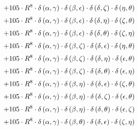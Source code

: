 \begin{subequations}
\begin{gather}
 \\[0.2em] \notag 		 + 105 \cdot R^{8} \cdot \delta{}\left(\alpha{}, \gamma{}\right) \cdot \delta{}\left(\beta{}, \epsilon{}\right) \cdot \delta{}\left(\delta{}, \zeta{}\right) \cdot \delta{}\left(\eta{}, \theta{}\right) 
 \\[0.2em] \notag 		 + 105 \cdot R^{8} \cdot \delta{}\left(\alpha{}, \gamma{}\right) \cdot \delta{}\left(\beta{}, \epsilon{}\right) \cdot \delta{}\left(\delta{}, \eta{}\right) \cdot \delta{}\left(\zeta{}, \theta{}\right) 
 \\[0.2em] \notag 		 + 105 \cdot R^{8} \cdot \delta{}\left(\alpha{}, \gamma{}\right) \cdot \delta{}\left(\beta{}, \epsilon{}\right) \cdot \delta{}\left(\delta{}, \theta{}\right) \cdot \delta{}\left(\zeta{}, \eta{}\right) 
 \\[0.2em] \notag 		 + 105 \cdot R^{8} \cdot \delta{}\left(\alpha{}, \gamma{}\right) \cdot \delta{}\left(\beta{}, \zeta{}\right) \cdot \delta{}\left(\delta{}, \epsilon{}\right) \cdot \delta{}\left(\eta{}, \theta{}\right) 
 \\[0.2em] \notag 		 + 105 \cdot R^{8} \cdot \delta{}\left(\alpha{}, \gamma{}\right) \cdot \delta{}\left(\beta{}, \zeta{}\right) \cdot \delta{}\left(\delta{}, \eta{}\right) \cdot \delta{}\left(\epsilon{}, \theta{}\right) 
 \\[0.2em] \notag 		 + 105 \cdot R^{8} \cdot \delta{}\left(\alpha{}, \gamma{}\right) \cdot \delta{}\left(\beta{}, \zeta{}\right) \cdot \delta{}\left(\delta{}, \theta{}\right) \cdot \delta{}\left(\epsilon{}, \eta{}\right) 
 \\[0.2em] \notag 		 + 105 \cdot R^{8} \cdot \delta{}\left(\alpha{}, \gamma{}\right) \cdot \delta{}\left(\beta{}, \eta{}\right) \cdot \delta{}\left(\delta{}, \epsilon{}\right) \cdot \delta{}\left(\zeta{}, \theta{}\right) 
 \\[0.2em] \notag 		 + 105 \cdot R^{8} \cdot \delta{}\left(\alpha{}, \gamma{}\right) \cdot \delta{}\left(\beta{}, \eta{}\right) \cdot \delta{}\left(\delta{}, \zeta{}\right) \cdot \delta{}\left(\epsilon{}, \theta{}\right) 
 \\[0.2em] \notag 		 + 105 \cdot R^{8} \cdot \delta{}\left(\alpha{}, \gamma{}\right) \cdot \delta{}\left(\beta{}, \eta{}\right) \cdot \delta{}\left(\delta{}, \theta{}\right) \cdot \delta{}\left(\epsilon{}, \zeta{}\right) 
 \\[0.2em] \notag 		 + 105 \cdot R^{8} \cdot \delta{}\left(\alpha{}, \gamma{}\right) \cdot \delta{}\left(\beta{}, \theta{}\right) \cdot \delta{}\left(\delta{}, \epsilon{}\right) \cdot \delta{}\left(\zeta{}, \eta{}\right) 

\end{gather}
\end{subequations}
